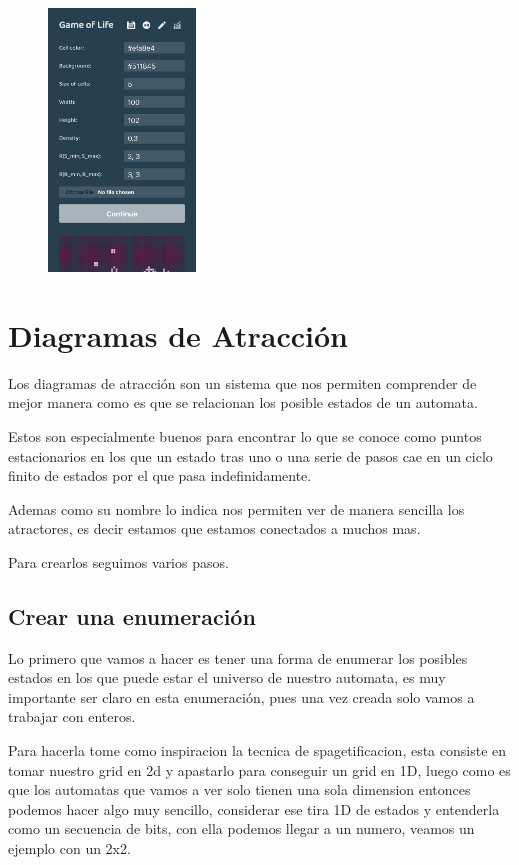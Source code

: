 \documentclass[12pt, fleqn]{report}                             %
\theoremstyle{break}                                            %
\begin{document}
\begin{figure}[ht!]
        \includegraphics[width=0.35\textwidth]{Game4.png}
      \end{figure}


  \chapter{Diagramas de Atracción}

      Los diagramas de atracción son un sistema que nos permiten comprender de mejor manera como es que se relacionan
      los posible estados de un automata.

      Estos son especialmente buenos para encontrar lo que se conoce como puntos estacionarios en los que un estado tras uno
      o una serie de pasos cae en un ciclo finito de estados por el que pasa indefinidamente.

      Ademas como su nombre lo indica nos permiten ver de manera sencilla los atractores, es decir estamos que estamos conectados
      a muchos mas.
      
      Para crearlos seguimos varios pasos.

      \section{Crear una enumeración}
        Lo primero que vamos a hacer es tener una forma de enumerar los posibles estados en los que puede estar el universo de nuestro
        automata, es muy importante ser claro en esta enumeración, pues una vez creada solo vamos a trabajar con enteros.

        Para hacerla tome como inspiracion la tecnica de spagetificacion, esta consiste en tomar nuestro grid en 2d y apastarlo
        para conseguir un grid en 1D, luego como es que los automatas que vamos a ver solo tienen una sola dimension entonces
        podemos hacer algo muy sencillo, considerar ese tira 1D de estados y entenderla como un secuencia de bits, con ella
        podemos llegar a un numero, veamos un ejemplo con un 2x2.
\end{document}
